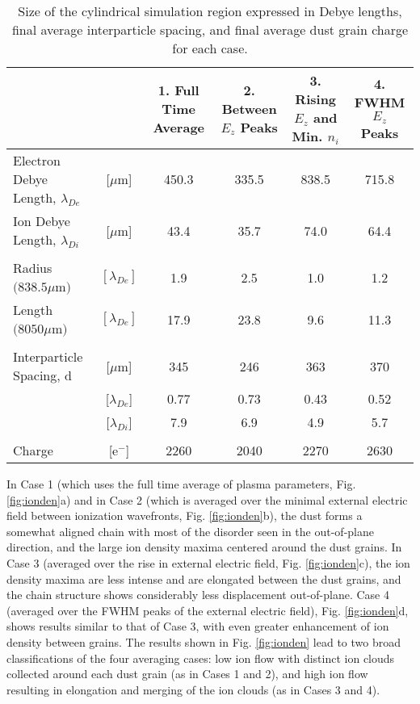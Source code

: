 \documentclass[aip,amsmath,amssymb,graphicx,floatfix,reprint]{revtex4-1}
\begin{document}
\begin{table*}
    \caption{Size of the cylindrical simulation region expressed in Debye lengths, final average interparticle spacing, and final average dust grain charge for each case.}
    \label{tab:lengths}
    \begin{ruledtabular}
    \begin{tabular}{lccccc}

     & & 1. Full Time Average & 2. Between $E_z$ Peaks  & 3. Rising $E_z$ and Min. $n_i$ & 4. FWHM $E_z$ Peaks \\
    \hline
    Electron Debye Length, $\lambda_{De}$ &[$\mu$m] & 450.3 & 335.5 & 838.5 & 715.8\\
    Ion Debye Length, $\lambda_{Di}$ &[$\mu$m] & 43.4 & 35.7 & 74.0 & 64.4 \\
    \\
    Radius $(838.5 \mu$m$)$ &$[\lambda_{De}]$ & 1.9 & 2.5 & 1.0 & 1.2\\
    Length $(8050 \mu$m$)$ &$[\lambda_{De}]$  & 17.9 & 23.8 & 9.6 & 11.3\\
    \\
    Interparticle Spacing, d &[$\mu$m] & 345 & 246 & 363 & 370 \\
     &[$\lambda_{De}$] & 0.77 & 0.73 & 0.43 & 0.52 \\
     &[$\lambda_{Di}$] & 7.9 & 6.9 & 4.9 & 5.7 \\
    \\
    Charge &[e$^-$] & 2260 & 2040 & 2270 & 2630 \\
      

    \end{tabular}
\end{ruledtabular}
\end{table*}

In Case 1 (which uses the full time average of plasma parameters, Fig. \ref{fig:ionden}a) and in Case 2 (which is averaged over the minimal external electric field between ionization wavefronts, Fig. \ref{fig:ionden}b), the dust forms a somewhat aligned chain with most of the disorder seen in the out-of-plane direction, and the large ion density maxima centered around the dust grains.  In Case 3 (averaged over the rise in external electric field, Fig. \ref{fig:ionden}c), the ion density maxima are less intense and are elongated between the dust grains, and the chain structure shows considerably less displacement out-of-plane.  Case 4 (averaged over the FWHM peaks of the external electric field), Fig. \ref{fig:ionden}d, shows results similar to that of Case 3, with even greater enhancement of ion density between grains.  The results shown in Fig. \ref{fig:ionden} lead to two broad classifications of the four averaging cases: low ion flow with distinct ion clouds collected around each dust grain (as in Cases 1 and 2), and high ion flow resulting in elongation and merging of the ion clouds (as in Cases 3 and 4).
\end{document}

